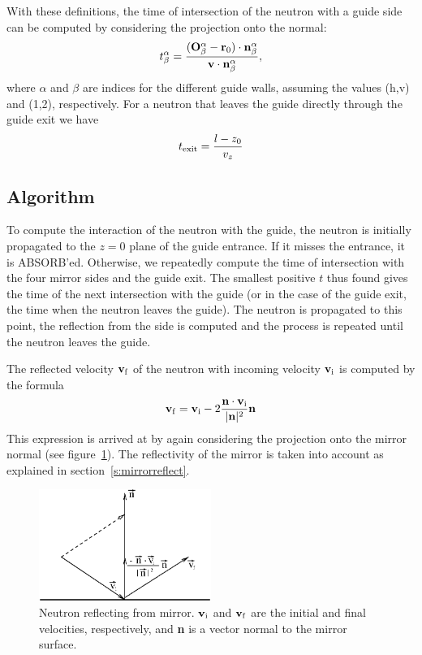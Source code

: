 With these definitions, the time of intersection of the neutron with a
guide side can be computed by considering the projection onto the
normal:
\begin{equation}
t^\alpha_\beta = \frac{({\bf O}^\alpha_\beta - {\bf r}_0) \cdot {\bf n}^\alpha_\beta} 
  {{\bf v} \cdot {\bf n}^\alpha_\beta}  ,
\end{equation}
where $\alpha$ and $\beta$ are indices for the different guide walls, 
assuming the values (h,v) and (1,2), respectively.
For a neutron that leaves the guide directly through the guide exit we have
\begin{equation}
t_{\rm exit} = \frac{l - z_0}{v_z}
\end{equation}

\subsection{Algorithm}
To compute the interaction of the neutron
with the guide, the neutron is initially propagated to the $z = 0$ plane of the
guide entrance. If it misses the entrance, it is ABSORB'ed. Otherwise,
we repeatedly compute the time of intersection with the
four mirror sides and the guide exit. The smallest positive $t$ thus
found gives the time of the next intersection with the guide (or in the
case of the guide exit, the time when the neutron leaves the guide). The
neutron is propagated to this point, the reflection from the side is
computed and the process is repeated until the neutron leaves the guide.

The reflected velocity ${\bf v}_{\rm f}$ of the neutron with incoming velocity
${\bf v}_{\rm i}$ is computed by the formula
\begin{equation}
 {\bf v}_{\rm f} =
  {\bf v}_{\rm i}
   - 2{{\bf n} \cdot {\bf v}_{\rm i} \over {|{\bf n}|^2}} {\bf n}
\end{equation}
This expression is arrived at by again considering the projection onto
the mirror normal (see figure~\ref{f:guidereflect}). The reflectivity of the
mirror is taken into account as explained in section~\ref{s:mirrorreflect}.

\begin{figure}
  \begin{center}
    \includegraphics[width=0.5\textwidth]{figures/guide2.eps}
  \end{center}
\caption{Neutron reflecting from mirror. ${\bf v}_{\rm i}$ and
${\bf v}_{\rm f}$ are the initial and final velocities, respectively,
and {\bf n} is a vector normal to the mirror surface.}
\label{f:guidereflect}
\end{figure}

